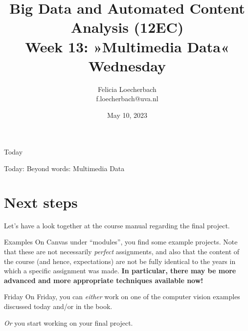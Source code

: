 \documentclass[compress]{beamer}
\begin{document}
\title[Big Data and Automated Content Analysis]{\textbf{Big Data and Automated Content Analysis (12EC)} 
\\Week 13: »Multimedia Data«
\\Wednesday}
\author[Felicia Loecherbach]{Felicia Loecherbach\\ \footnotesize{f.loecherbach@uva.nl \\}}
\date{May 10, 2023}


\begin{frame}{}
	\titlepage
\end{frame}

\begin{frame}{Today}
	\tableofcontents
\end{frame}


\begin{frame}[standout]
Today: Beyond words: Multimedia Data
\end{frame}









\section{Next steps}
\begin{frame}[standout]
Let's have a look together at the course manual regarding the final project.
\end{frame}

\begin{frame}{Examples}
On Canvas under ``modules'', you find some example projects. Note that these are not necessarily \emph{perfect} assignments, and also that the content of the course (and hence, expectations) are not be fully identical to the years in which a specific assignment was made. \textbf{In particular, there may be more advanced and more appropriate techniques available now!}
\end{frame}

\begin{frame}{Friday}
On Friday, you can \emph{either} work on one of the computer vision examples discussed today and/or in the book.

\emph{Or} you start working on your final project.

\end{frame}


\begin{frame}
\printbibliography
\end{frame}
\end{document}
